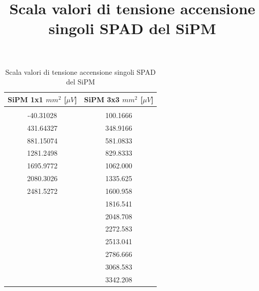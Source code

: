 \documentclass[journal]{IEEEtran}
\begin{document}
\begin{table}[H]
    \centering
    \title{Scala valori di tensione accensione singoli SPAD del SiPM}
    \begin{tabular}{c|c}
    SiPM 1x1 $mm^2$ [$\mu V$]     &  SiPM 3x3 $mm^2$ [$\mu V$] \\
    \hline \\
         -40.31028 & 100.1666\\ 
         431.64327 & 348.9166\\ 
         881.15074 & 581.0833\\ 
         1281.2498 & 829.8333\\ 
         1695.9772 & 1062.000\\ 
         2080.3026 & 1335.625\\ 
         2481.5272 & 1600.958\\ 
                   & 1816.541\\ 
                   & 2048.708\\ 
                   & 2272.583\\ 
                   & 2513.041\\ 
                   & 2786.666\\ 
                   & 3068.583\\ 
                   & 3342.208\\
                
    \end{tabular}
    \vspace{5 mm}
    \caption{Scala valori di tensione accensione singoli SPAD del SiPM}
    \label{tab:SiPMscale}
\end{table}

\tableofcontents

\printbibliography
\end{document}
